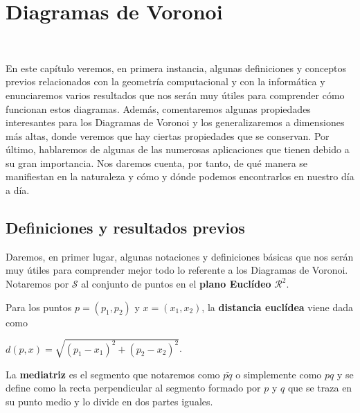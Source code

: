 \chapter{Diagramas de Voronoi}$\label{capi3}$

En este capítulo veremos, en primera instancia, algunas definiciones y conceptos previos relacionados con la geometría computacional y con la informática y enunciaremos varios resultados que nos serán muy útiles para comprender cómo funcionan estos diagramas. Además, comentaremos algunas propiedades interesantes para los Diagramas de Voronoi y los generalizaremos a dimensiones más altas, donde veremos que hay ciertas propiedades que se conservan. Por último, hablaremos de algunas de las numerosas aplicaciones que tienen debido a su gran importancia. Nos daremos cuenta, por tanto, de qué manera se manifiestan en la naturaleza y cómo y dónde podemos encontrarlos en nuestro día a día.

\section{Definiciones y resultados previos}

Daremos, en primer lugar, algunas notaciones y definiciones básicas que nos serán muy útiles para comprender mejor todo lo referente a los Diagramas de Voronoi. Notaremos por $\mathcal{S}$ al conjunto de puntos en el \textbf{plano Euclídeo} $\mathcal{R}^{2}$. 

\begin{definicion}
Para los puntos $p=(p_{1},p_{2})$ y $x=(x_{1},x_{2})$, la \textbf{distancia euclídea} viene dada como

\vspace{0.3cm}

\center $d(p,x) = \sqrt{(p_{1}-x_{1})^{2}+(p_{2}-x_{2})^{2}}$.
\end{definicion}
\vspace{0.3cm}

\begin{definicion}	
La \textbf{mediatriz} es el segmento que notaremos como $\bar{pq}$ o simplemente como $pq$ y se define como la recta perpendicular al segmento formado por $p$ y $q$ que se traza en su punto medio y lo divide en dos partes iguales.
\end{definicion}
\vspace{0.3cm}

